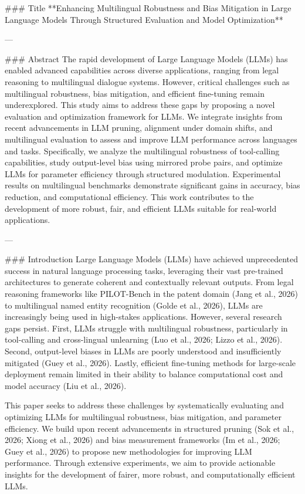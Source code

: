 ### Title
**Enhancing Multilingual Robustness and Bias Mitigation in Large Language Models Through Structured Evaluation and Model Optimization**

---

### Abstract
The rapid development of Large Language Models (LLMs) has enabled advanced capabilities across diverse applications, ranging from legal reasoning to multilingual dialogue systems. However, critical challenges such as multilingual robustness, bias mitigation, and efficient fine-tuning remain underexplored. This study aims to address these gaps by proposing a novel evaluation and optimization framework for LLMs. We integrate insights from recent advancements in LLM pruning, alignment under domain shifts, and multilingual evaluation to assess and improve LLM performance across languages and tasks. Specifically, we analyze the multilingual robustness of tool-calling capabilities, study output-level bias using mirrored probe pairs, and optimize LLMs for parameter efficiency through structured modulation. Experimental results on multilingual benchmarks demonstrate significant gains in accuracy, bias reduction, and computational efficiency. This work contributes to the development of more robust, fair, and efficient LLMs suitable for real-world applications.

---

### Introduction
Large Language Models (LLMs) have achieved unprecedented success in natural language processing tasks, leveraging their vast pre-trained architectures to generate coherent and contextually relevant outputs. From legal reasoning frameworks like PILOT-Bench in the patent domain (Jang et al., 2026) to multilingual named entity recognition (Golde et al., 2026), LLMs are increasingly being used in high-stakes applications. However, several research gaps persist. First, LLMs struggle with multilingual robustness, particularly in tool-calling and cross-lingual unlearning (Luo et al., 2026; Lizzo et al., 2026). Second, output-level biases in LLMs are poorly understood and insufficiently mitigated (Guey et al., 2026). Lastly, efficient fine-tuning methods for large-scale deployment remain limited in their ability to balance computational cost and model accuracy (Liu et al., 2026).

This paper seeks to address these challenges by systematically evaluating and optimizing LLMs for multilingual robustness, bias mitigation, and parameter efficiency. We build upon recent advancements in structured pruning (Sok et al., 2026; Xiong et al., 2026) and bias measurement frameworks (Im et al., 2026; Guey et al., 2026) to propose new methodologies for improving LLM performance. Through extensive experiments, we aim to provide actionable insights for the development of fairer, more robust, and computationally efficient LLMs.

